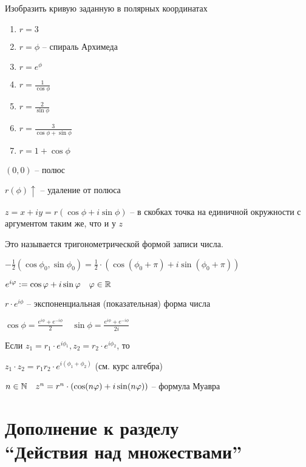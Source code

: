         Изобразить кривую заданную в полярных координатах 
        \begin{enumerate}
            \item $r = 3$
            \item $r = \phi$ -- спираль Архимеда
            \item $r = e^{\phi}$
            \item $r = \frac{1}{\cos \phi}$
            \item $r = \frac{2}{\sin \phi}$
            \item $r = \frac{3}{\cos \phi + \sin \phi}$
            \item $r = 1+\cos \phi$
        \end{enumerate}

        $(0,0)$ -- полюс

        $r(\phi) \uparrow$ -- удаление от полюса

        $z = x+iy = r(\cos \phi + i\sin \phi)$ -- в скобках точка на единичной окружности с аргументом таким же, что и у $z$

        Это называется тригонометрической формой записи числа.

        $-\frac{1}{2}(\cos \phi_0, \sin \phi_0) = \frac{1}{2} \cdot  \left( \cos (\phi_0+\pi ) + i\sin (\phi_0+\pi ) \right) $

        $e^{i\varphi}:=\cos \varphi + i\sin\varphi\quad \varphi\in \mathbb{R}$

        $r\cdot e^{i\phi}$ -- экспоненциальная (показательная) форма числа

        $\cos \phi = \frac{e^{i\phi} + e^{-i\phi}}{2}\quad \sin \phi = \frac{e^{i\phi} + e^{-i\phi}}{2i}$

        Если $z_1 = r_1 \cdot  e^{i\phi_1}, z_2 = r_2 \cdot  e^{i\phi_2}$, то 

        $z_1\cdot z_2 = r_1r_2\cdot e^{i\left( \phi_1 + \phi_2 \right) }$ (см. курс алгебра)

        $n\in \mathbb{N} \quad z^n = r^n \cdot  (\cos (n\varphi) + i\sin(n\varphi))$ -- формула Муавра

        \section{Дополнение к разделу\\``Действия над множествами''}

